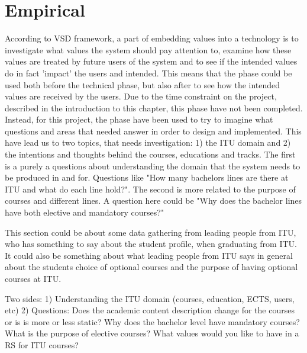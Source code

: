 \section{Empirical}
According to VSD framework, a part of embedding values into a technology is to investigate what values the system should pay attention to, examine how these values are treated by future users of the system and to see if the intended values do in fact 'impact' the users and intended. This means that the phase could be used both before the technical phase, but also after to see how the intended values are received by the users. 
Due to the time constraint on the project, described in the introduction to this chapter, this phase have not been completed. Instead, for this project, the phase have been used to try to imagine what questions and areas that needed answer in order to design and implemented. This have lead us to two topics, that needs investigation: 1) the ITU domain and 2) the intentions and thoughts behind the courses, educations and tracks. The first is a purely a questions about understanding the domain that the system needs to be produced in and for. Questions like "How many bachelors lines are there at ITU and what do each line hold?". The second is more related to the purpose of courses and different lines. A question here could be "Why does the bachelor lines have both elective and mandatory courses?"

This section could be about some data gathering from leading people from ITU, who has something to say about the student profile, when graduating from ITU. It could also be something about what leading people from ITU says in general about the students choice of optional courses and the purpose of having optional courses at ITU. 

Two sides:
1) Understanding the ITU domain (courses, education, ECTS, users, etc)
2) Questions:
Does the academic content description change for the courses or is is more or less static?
Why does the bachelor level have mandatory courses?
What is the purpose of elective courses?
What values would you like to have in a RS for ITU courses?




